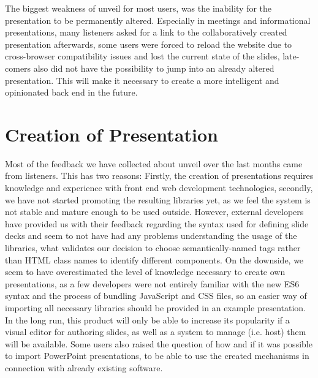 The biggest weakness of unveil for most users, was the inability for the presentation to be permanently altered. Especially in meetings and informational presentations, many listeners asked for a link to the collaboratively created presentation afterwards, some users were forced to reload the website due to cross-browser compatibility issues and lost the current state of the slides, late-comers also did not have the possibility to jump into an already altered presentation. This will make it necessary to create a more intelligent and opinionated back end in the future.

\section{Creation of Presentation}
Most of the feedback we have collected about unveil over the last months came from listeners. This has two reasons: Firstly, the creation of presentations requires knowledge and experience with front end web development technologies, secondly, we have not started promoting the resulting libraries yet, as we feel the system is not stable and mature enough to be used outside. However, external developers have provided us with their feedback regarding the syntax used for defining slide decks and seem to not have had any problems understanding the usage of the libraries, what validates our decision to choose semantically-named tags rather than HTML class names to identify different components. On the downside, we seem to have overestimated the level of knowledge necessary to create own presentations, as a few developers were not entirely familiar with the new ES6 syntax and the process of bundling JavaScript and CSS files, so an easier way of importing all necessary libraries should be provided in an example presentation.
In the long run, this product will only be able to increase its popularity if a visual editor for authoring slides, as well as a system to manage (i.e. host) them will be available. Some users also raised the question of how and if it was possible to import PowerPoint presentations, to be able to use the created mechanisms in connection with already existing software.

